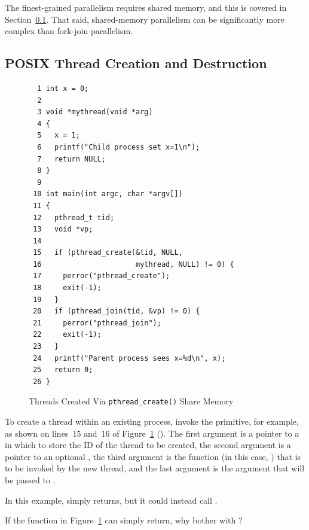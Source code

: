 The finest-grained parallelism requires shared memory, and
this is covered in
Section~\ref{sec:toolsoftrade:POSIX Thread Creation and Destruction}.
That said, shared-memory parallelism can be significantly more complex
than fork-join parallelism.

\subsection{POSIX Thread Creation and Destruction}
\label{sec:toolsoftrade:POSIX Thread Creation and Destruction}

\begin{figure}[tbp]
{ \scriptsize
\begin{verbatim}
  1 int x = 0;
  2 
  3 void *mythread(void *arg)
  4 {
  5   x = 1;
  6   printf("Child process set x=1\n");
  7   return NULL;
  8 }
  9 
 10 int main(int argc, char *argv[])
 11 {
 12   pthread_t tid;
 13   void *vp;
 14 
 15   if (pthread_create(&tid, NULL,
 16                      mythread, NULL) != 0) {
 17     perror("pthread_create");
 18     exit(-1);
 19   }
 20   if (pthread_join(tid, &vp) != 0) {
 21     perror("pthread_join");
 22     exit(-1);
 23   }
 24   printf("Parent process sees x=%d\n", x);
 25   return 0;
 26 }
\end{verbatim}
}
\caption{Threads Created Via {\tt pthread\_create()} Share Memory}
\label{fig:toolsoftrade:Threads Created Via pthread-create() Share Memory}
\end{figure}

To create a thread within an existing process, invoke the
 primitive, for example, as shown on lines~15
and~16 of
Figure~\ref{fig:toolsoftrade:Threads Created Via pthread-create() Share Memory}
().
The first argument is a pointer to a  in which to store the
ID of the thread to be created, the second  argument is a pointer
to an optional , the third argument is the function
(in this case, )
that is to be invoked by the new thread, and the last  argument
is the argument that will be passed to .

In this example,  simply returns, but it could instead
call .

\QuickQuiz{}
	If the  function in
	Figure~\ref{fig:toolsoftrade:Threads Created Via pthread-create() Share Memory}
	can simply return, why bother with ?
 \QuickQuizEnd

